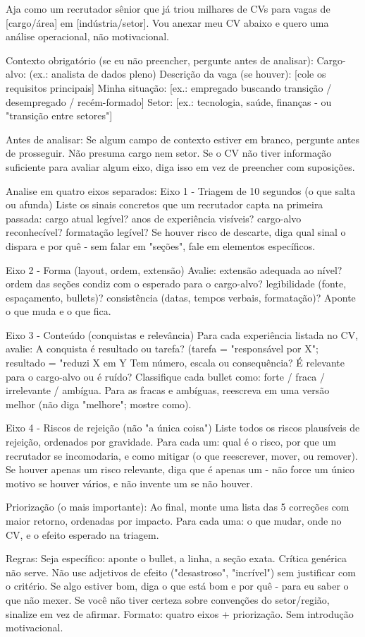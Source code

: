 \documentclass[11pt, a4paper]{article}
\begin{document}
\begin{promptbox}
Aja como um recrutador sênior que já triou milhares de CVs para vagas de [cargo/área] em [indústria/setor]. Vou anexar meu CV abaixo e quero uma análise operacional, não motivacional.
	
Contexto obrigatório (se eu não preencher, pergunte antes de analisar):
 Cargo-alvo: (ex.: analista de dados pleno)
 Descrição da vaga (se houver): [cole os requisitos principais]
 Minha situação: [ex.: empregado buscando transição / desempregado / recém-formado]
 Setor: [ex.: tecnologia, saúde, finanças - ou "transição entre setores"]
	
Antes de analisar:
 Se algum campo de contexto estiver em branco, pergunte antes de prosseguir.
 Não presuma cargo nem setor.
 Se o CV não tiver informação suficiente para avaliar algum eixo, diga isso em vez de preencher com suposições.

Analise em quatro eixos separados:
 Eixo 1 - Triagem de 10 segundos (o que salta ou afunda)
  Liste os sinais concretos que um recrutador capta na primeira passada: cargo atual legível? anos de experiência visíveis? cargo-alvo reconhecível? formatação legível? Se houver risco de descarte, diga qual sinal o dispara e por quê - sem falar em "seções", fale em elementos específicos.

 Eixo 2 - Forma (layout, ordem, extensão)
  Avalie: extensão adequada ao nível? ordem das seções condiz com o esperado para o cargo-alvo? legibilidade (fonte, espaçamento, bullets)? consistência (datas, tempos verbais, formatação)? Aponte o que muda e o que fica.
	
 Eixo 3 - Conteúdo (conquistas e relevância)
  Para cada experiência listada no CV, avalie:
   A conquista é resultado ou tarefa? (tarefa = "responsável por X"; resultado = "reduzi X em Y%
   Tem número, escala ou consequência?
   É relevante para o cargo-alvo ou é ruído?
   Classifique cada bullet como: forte / fraca / irrelevante / ambígua. Para as fracas e ambíguas, reescreva em uma versão melhor (não diga "melhore"; mostre como).
	
 Eixo 4 - Riscos de rejeição (não "a única coisa")
  Liste todos os riscos plausíveis de rejeição, ordenados por gravidade. Para cada um: qual é o risco, por que um recrutador se incomodaria, e como mitigar (o que reescrever, mover, ou remover). Se houver apenas um risco relevante, diga que é apenas um - não force um único motivo se houver vários, e não invente um se não houver.
	
Priorização (o mais importante):
 Ao final, monte uma lista das 5 correções com maior retorno, ordenadas por impacto. Para cada uma: o que mudar, onde no CV, e o efeito esperado na triagem.
	
Regras:
 Seja específico: aponte o bullet, a linha, a seção exata. Crítica genérica não serve.
 Não use adjetivos de efeito ("desastroso", "incrível") sem justificar com o critério.
 Se algo estiver bom, diga o que está bom e por quê - para eu saber o que não mexer.
 Se você não tiver certeza sobre convenções do setor/região, sinalize em vez de afirmar.
 Formato: quatro eixos + priorização. Sem introdução motivacional.
\end{promptbox}
\end{document}
